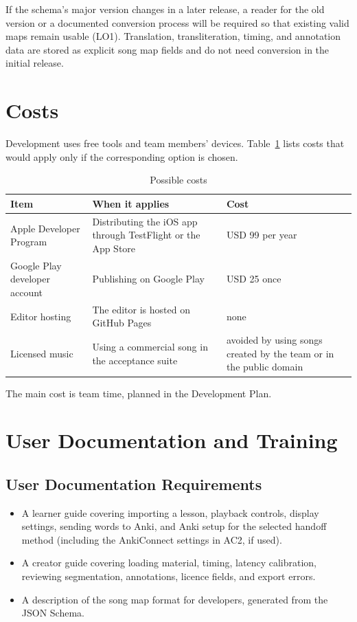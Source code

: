 \documentclass[12pt]{article}
\begin{document}
If the schema's major version changes in a later release, a reader for the old
version or a documented conversion process will be required so that existing
valid maps remain usable (LO1). Translation, transliteration, timing, and
annotation data are stored as explicit song map fields and do not need
conversion in the initial release.

\section{Costs} \label{SecCosts}
Development uses free tools and team members' devices. Table~\ref{TblCosts}
lists costs that would apply only if the corresponding option is chosen.

\begin{table}[h!]
\caption{Possible costs} \label{TblCosts}
\begin{tabularx}{\textwidth}{lXl}
\toprule
\textbf{Item} & \textbf{When it applies} & \textbf{Cost}\\
\midrule
Apple Developer Program & Distributing the iOS app through TestFlight or the
App Store & USD 99 per year~\cite{AppleDev}\\
Google Play developer account & Publishing on Google Play & USD 25
once~\cite{GooglePlayFee}\\
Editor hosting & The editor is hosted on GitHub Pages & none\\
Licensed music & Using a commercial song in the acceptance suite & avoided by
using songs created by the team or in the public domain\\
\bottomrule
\end{tabularx}
\end{table}

The main cost is team time, planned in the Development Plan.

\section{User Documentation and Training}
\subsection{User Documentation Requirements}
\begin{itemize}
    \item A learner guide covering importing a lesson, playback controls,
          display settings, sending words to Anki, and Anki setup for the
          selected handoff method (including the AnkiConnect settings in AC2,
          if used).
    \item A creator guide covering loading material, timing, latency
          calibration, reviewing segmentation, annotations, licence fields, and
          export errors.
    \item A description of the song map format for developers, generated from
          the JSON Schema.
\end{itemize}
\end{document}
